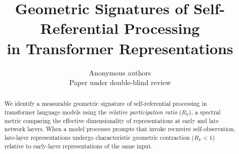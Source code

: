 \documentclass{article}
\title{Geometric Signatures of Self-Referential Processing\\
       in Transformer Representations}
\author{Anonymous authors\\Paper under double-blind review}
\newcommand{\RV}{R_V}
\begin{document}
\ifcolmsubmission
\linenumbers
\fi

\maketitle

\begin{abstract}
We identify a measurable geometric signature of self-referential processing in transformer language
models using the \emph{relative participation ratio} ($\RV$), a spectral metric comparing the
effective dimensionality of representations at early and late network layers.
When a model processes prompts that invoke recursive self-observation, late-layer representations
undergo characteristic geometric contraction ($\RV < 1$) relative to early-layer representations
of the same input.


\end{abstract}
\end{document}
